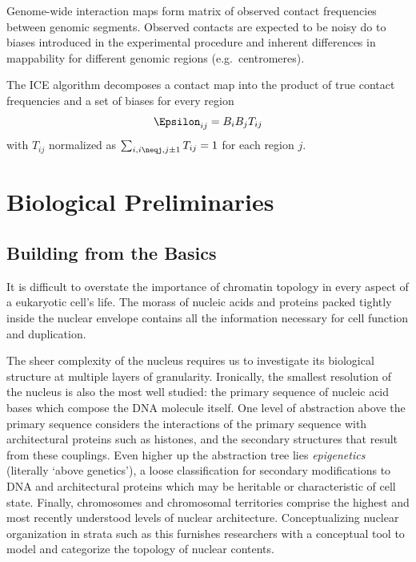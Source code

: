 \documentclass[phd,tocprelim]{cornell}
\begin{document}
Genome-wide interaction maps form matrix of observed contact frequencies between genomic segments.  Observed contacts are expected to
be noisy do to biases introduced in the experimental procedure and inherent differences in mappability for different genomic regions
(e.g.\ centromeres).


The ICE algorithm decomposes a contact map into the product of true contact frequencies and a set of biases for every region
\[
  \Epsilon_{ij} = B_{i}B_{j}T_{ij}
\]
with $T_{ij}$ normalized as $\sum_{i,i\neqj,j\pm1}T_{ij} = 1$ for each region $j$.





\chapter{Biological Preliminaries}

\section{Building from the Basics}

It is difficult to overstate the importance of chromatin topology in
every aspect of a eukaryotic cell's life.  The morass of nucleic acids and
proteins packed tightly inside the nuclear envelope contains all the
information necessary for cell function and duplication.

The sheer complexity of the nucleus requires us to investigate its biological
structure at multiple layers of granularity.  Ironically, the smallest resolution
of the nucleus is also the most well studied: the primary sequence of nucleic
acid bases which compose the DNA molecule itself.  One level of abstraction
above the primary sequence considers the interactions of the primary sequence
with architectural proteins such as histones, and the secondary structures that
result from these couplings.  Even higher up the abstraction tree lies
\textit{epigenetics} (literally `above genetics'\cite{dictepi2014}), a loose
classification for secondary modifications to DNA and architectural proteins
which may be heritable or characteristic of cell state.  Finally, chromosomes
and chromosomal territories comprise the highest and most recently understood
levels of nuclear architecture.  Conceptualizing nuclear organization in
strata such as this furnishes researchers with a conceptual tool to model
and categorize the topology of nuclear contents.
\end{document}

